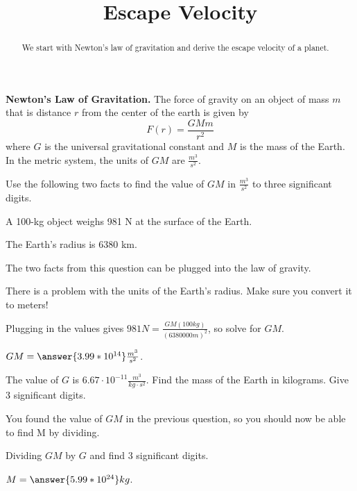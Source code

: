 \documentclass{ximera}
\title{Escape Velocity}
\begin{document}
\begin{abstract}
We start with Newton's law of gravitation and derive the escape velocity of a planet.
\end{abstract}
\maketitle

\begin{observation}
\textbf{Newton's Law of Gravitation.} The force of gravity on an object of mass $m$ that is distance $r$ from the center of the earth is given by
$$ F(r) = \frac{G M m}{r^2}$$
where $G$ is the universal gravitational constant and $M$ is the mass of the Earth. In the metric system, the units of $G M$ are $\frac{m^3}{s^2}$.
\end{observation}

\begin{question}
Use the following two facts to find the value of $GM$ in $\frac{m^3}{s^2}$ to three significant digits. 
\begin{observation} A 100-kg object weighs 981 N at the surface of the Earth. \end{observation}
\begin{observation} The Earth's radius is 6380 km. \end{observation}

\begin{solution}
\begin{hint}
The two facts from this question can be plugged into the law of gravity.
\end{hint}
\begin{hint}
There is a problem with the units of the Earth's radius. Make sure you convert it to meters!
\end{hint}
\begin{hint}
Plugging in the values gives $981 N = \frac{GM (100 kg)}{(6380000 m)^2}$, so solve for $GM$.
\end{hint}
$GM = \answer{3.99 * 10^{14}} \frac{m^3}{s^2}$.
\end{solution}
\end{question}

\begin{question}
The value of $G$ is $6.67 \cdot 10^{-11} \frac{m^3}{kg \cdot s^2}$. Find the mass of the Earth in kilograms. Give 3 significant digits.
\begin{solution}
\begin{hint}
You found the value of $G M$ in the previous question, so you should now be able to find M by dividing.
\end{hint}
\begin{hint}
Dividing $G M$ by $G$ and find 3 significant digits. 
\end{hint}
$M = \answer{5.99*10^{24}} kg$.
\end{solution}
\end{question}
\end{document}
